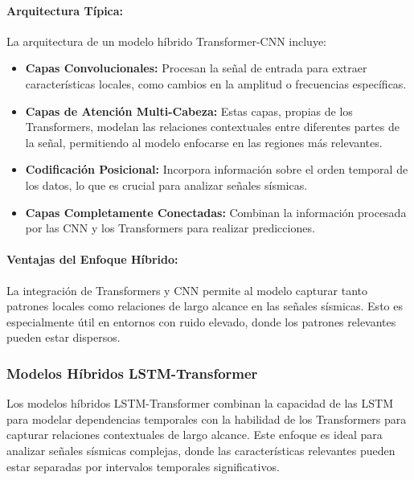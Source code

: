 \paragraph{Arquitectura Típica:}
La arquitectura de un modelo híbrido Transformer-CNN incluye:
\begin{itemize}
    \item \textbf{Capas Convolucionales:} Procesan la señal de entrada para extraer características locales, como cambios en la amplitud o frecuencias específicas.
    \item \textbf{Capas de Atención Multi-Cabeza:} Estas capas, propias de los Transformers, modelan las relaciones contextuales entre diferentes partes de la señal, permitiendo al modelo enfocarse en las regiones más relevantes.
    \item \textbf{Codificación Posicional:} Incorpora información sobre el orden temporal de los datos, lo que es crucial para analizar señales sísmicas.
    \item \textbf{Capas Completamente Conectadas:} Combinan la información procesada por las CNN y los Transformers para realizar predicciones.
\end{itemize}

\paragraph{Ventajas del Enfoque Híbrido:}
La integración de Transformers y CNN permite al modelo capturar tanto patrones locales como relaciones de largo alcance en las señales sísmicas. Esto es especialmente útil en entornos con ruido elevado, donde los patrones relevantes pueden estar dispersos.

\subsubsection{Modelos Híbridos LSTM-Transformer}

Los modelos híbridos LSTM-Transformer combinan la capacidad de las LSTM para modelar dependencias temporales con la habilidad de los Transformers para capturar relaciones contextuales de largo alcance. Este enfoque es ideal para analizar señales sísmicas complejas, donde las características relevantes pueden estar separadas por intervalos temporales significativos.

